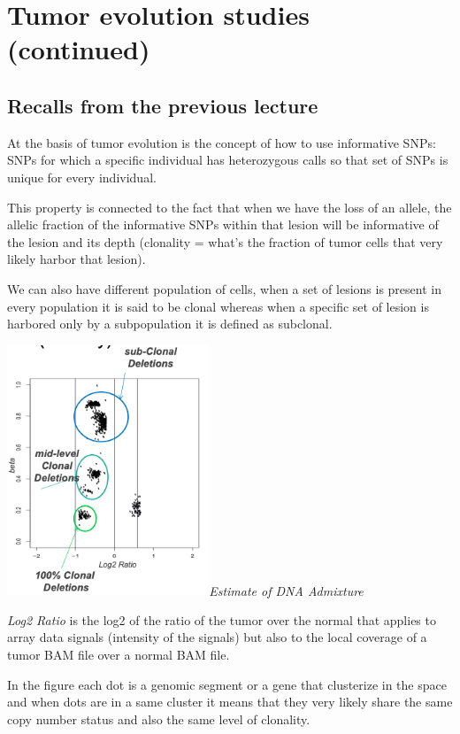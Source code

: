 \graphicspath{{chapters/TumorEvStudiesIIImages/}}

\chapter{Tumor evolution studies (continued)}


\section{Recalls from the previous lecture}

At the basis of tumor evolution is the concept of how to use {informative SNPs}:
SNPs for which a specific individual has heterozygous calls so that set of SNPs
is unique for every individual.

This property is connected to the fact that when we have the loss of an allele,
the allelic fraction of the informative SNPs within that lesion will be
informative of the lesion and its depth (clonality = what's the fraction of
tumor cells that very likely harbor that lesion).

We can also have different population of cells, when a set of lesions is present
in every population it is said to be clonal whereas when a specific set of
lesion is harbored only by a subpopulation it is defined as subclonal.

\includegraphics[width=2.37708in,height=2.94375in]{image1.png}\emph{Estimate of
DNA Admixture}

\emph{{Log2 Ratio}} is the log2 of the ratio of the tumor over the normal that
applies to array data signals (intensity of the signals) but also to the local
coverage of a tumor BAM file over a normal BAM file.

In the figure each dot is a genomic segment or a gene that clusterize in the
space and when dots are in a same cluster it means that they very likely share
the same copy number status and also the same level of clonality.

